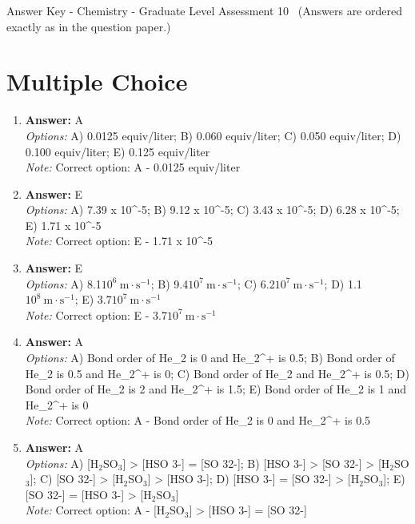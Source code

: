 \documentclass[12pt]{article}
\begin{document}
\begin{center}
Answer Key - Chemistry - Graduate Level Assessment 10 \
\small (Answers are ordered exactly as in the question paper.)
\end{center}

\section*{Multiple Choice}
\begin{enumerate}[label=\arabic*.]
\item \textbf{Answer:} A
\\ \textit{Options:} A) 0.0125 equiv/liter; B) 0.060 equiv/liter; C) 0.050 equiv/liter; D) 0.100 equiv/liter; E) 0.125 equiv/liter
\\ \textit{Note:} Correct option: A - 0.0125 equiv/liter
\item \textbf{Answer:} E
\\ \textit{Options:} A) 7.39 x 10^-5; B) 9.12 x 10^-5; C) 3.43 x 10^-5; D) 6.28 x 10^-5; E) 1.71 x 10^-5
\\ \textit{Note:} Correct option: E - 1.71 x 10^-5
\item \textbf{Answer:} E
\\ \textit{Options:} A) 8.1$10^6 \mathrm{~m} \cdot \mathrm{s}^{-1}$; B) 9.4$10^7 \mathrm{~m} \cdot \mathrm{s}^{-1}$; C) 6.2$10^7 \mathrm{~m} \cdot \mathrm{s}^{-1}$; D) 1.1$10^8 \mathrm{~m} \cdot \mathrm{s}^{-1}$; E) 3.7$10^7 \mathrm{~m} \cdot \mathrm{s}^{-1}$
\\ \textit{Note:} Correct option: E - 3.7$10^7 \mathrm{~m} \cdot \mathrm{s}^{-1}$
\item \textbf{Answer:} A
\\ \textit{Options:} A) Bond order of He\_2 is 0 and He\_2^+ is 0.5; B) Bond order of He\_2 is 0.5 and He\_2^+ is 0; C) Bond order of He\_2 and He\_2^+ is 0.5; D) Bond order of He\_2 is 2 and He\_2^+ is 1.5; E) Bond order of He\_2 is 1 and He\_2^+ is 0
\\ \textit{Note:} Correct option: A - Bond order of He\_2 is 0 and He\_2^+ is 0.5
\item \textbf{Answer:} A
\\ \textit{Options:} A) [H$_{2}$SO$_{3}$] \textgreater{} [HSO 3-] = [SO 32-]; B) [HSO 3-] \textgreater{} [SO 32-] \textgreater{} [H$_{2}$SO$_{3}$]; C) [SO 32-] \textgreater{} [H$_{2}$SO$_{3}$] \textgreater{} [HSO 3-]; D) [HSO 3-] = [SO 32-] \textgreater{} [H$_{2}$SO$_{3}$]; E) [SO 32-] = [HSO 3-] \textgreater{} [H$_{2}$SO$_{3}$]
\\ \textit{Note:} Correct option: A - [H$_{2}$SO$_{3}$] \textgreater{} [HSO 3-] = [SO 32-]
\end{enumerate}
\end{document}
